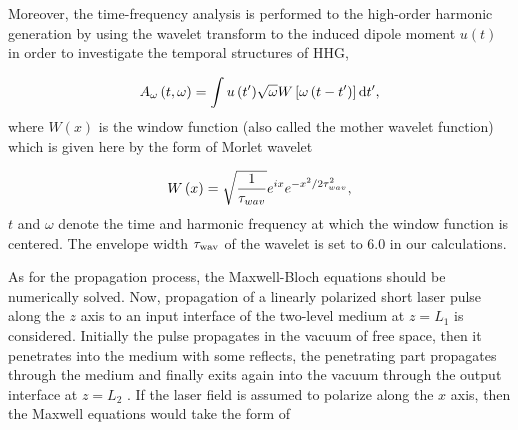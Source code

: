 \documentclass[10pt,letterpaper]{article}
\begin{document}
Moreover, the time-frequency analysis is performed to the high-order harmonic generation by using the wavelet transform to the induced dipole moment ${u}\left( t \right)$ in order to investigate the temporal structures of HHG,

\begin{equation}
{A_\omega }\left( {t,\omega } \right) = \int {{u}\left( {t'} \right)} \sqrt \omega  {W}\left[ {\omega \left( {t - t'} \right)} \right]{\rm{d}}t',
\label{eq8}
\end{equation}
where  $ {W}(x) $ is the window function (also called the mother wavelet function) which is given here by the form of Morlet wavelet \cite{CuiNi2010NJP-wavelet,MyOE2013,TongXiaoMin2000PRA-Wavelet}

\begin{equation}
{{W}}\left( x \right) = \sqrt {\frac{{\rm{1}}}{{{\tau _{wav}}}}} {e^{ix}}{e^{ - {x^2}/2\tau _{wav}^2}},
\label{eq9}
\end{equation}
$ t $ and $ \omega $ denote the time and harmonic frequency at which the window function is centered. The envelope width $ \tau_{\rm{wav}} $ of the wavelet is set to 6.0 in our calculations.

As for the propagation process, the Maxwell-Bloch equations should be numerically solved. Now, propagation of a linearly polarized short laser pulse along the $ z $ axis to an input interface of the two-level medium at $ z=L_{1} $ is considered. Initially the pulse propagates in the vacuum of free space, then it penetrates into the medium with some reflects, the penetrating part propagates through the medium and finally exits again into the vacuum through the output interface at $ z=L_{2} $ \cite{Kalosha-Two-Level-PRL-1999}. If the laser field is assumed to polarize along  the $ x $ axis, then the Maxwell equations would take the form of
\end{document}
